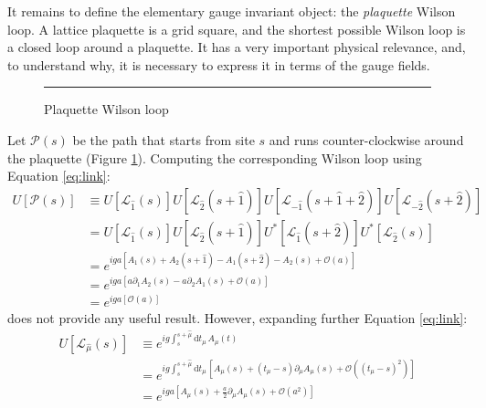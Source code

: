 It remains to define the elementary gauge invariant object: the \emph{plaquette} Wilson loop.
A lattice plaquette is a grid square, and the shortest possible Wilson loop is a closed loop around a plaquette.
It has a very important physical relevance, and, to understand why,
it is necessary to express it in terms of the gauge fields.

\begin{figure}[!htb]
    \centering
    \rule{3in}{1.5in}
    \caption{Plaquette Wilson loop}
    \label{fig:plaq}
\end{figure}
Let $\mathcal P(s)$ be the path that starts from site $s$ and runs counter-clockwise around the plaquette (Figure \ref{fig:plaq}).
Computing the corresponding Wilson loop using Equation \eqref{eq:link}:
\begin{equation*}
    \begin{aligned}
        U[\mathcal P(s)] &\equiv U[\mathcal L_{\hat 1}(s)] U[\mathcal L_{\hat 2}(s+\hat 1)] U[\mathcal L_{-\hat 1}(s+\hat 1+\hat 2)] U[\mathcal L_{-\hat 2}(s+\hat 2)] \\
                              &= U[\mathcal L_{\hat 1}(s)] U[\mathcal L_{\hat 2}(s+\hat 1)] U^*[\mathcal L_{\hat 1}(s+\hat 2)] U^*[\mathcal L_{\hat 2}(s)] \\
                              &= e^{iga[A_1(s) + A_2(s+\hat 1) - A_1(s+\hat 2) - A_2(s) + \mathcal O\left(a\right)]} \\
                              &= e^{iga[a\partial_1A_2(s) - a\partial_2A_1(s) + \mathcal O\left(a\right)]} \\
                              &= e^{iga\left[\mathcal O\left(a\right)\right]}
    \end{aligned}
\end{equation*}
does not provide any useful result. However, expanding further Equation \eqref{eq:link}:
\begin{equation*}%
    \begin{aligned}
        U[\mathcal L_{\hat\mu}(s)] &\equiv e^{ig\int_s^{s+\hat\mu}\mathrm dt_\mu\,A_\mu(t)} \\
                       &= e^{ig\int_s^{s+\hat\mu}\mathrm dt_\mu\,\left[A_\mu(s) + (t_\mu-s)\partial_\mu A_\mu(s) + \mathcal O\left((t_\mu-s)^2\right)\right]} \\
                       &= e^{iga\left[A_\mu(s) + \frac{a}{2}\partial_\mu A_\mu(s) + \mathcal O\left(a^2\right)\right]} \\
    \end{aligned}
\end{equation*}
